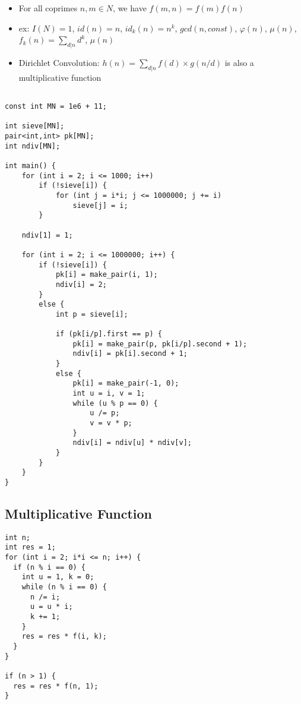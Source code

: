 \documentclass[11pt,a4paper]{article}
\begin{document}
\begin{multicols*}{2}
\begin{itemize}
    \item For all coprimes $n, m \in N$, we have $f(m, n) = f(m)f(n)$
    \item ex: $I(N) = 1$, $id(n) = n$, $id_k(n) = n^k$, $gcd(n, const)$, $\varphi(n)$, $\mu(n)$, $f_k(n) = \sum_{d|n}d^k$, $\mu(n)$
    \item Dirichlet Convolution: $h(n) = \sum_{d|n} f(d) \times g(n/d)$ is also a multiplicative function
\end{itemize}

\begin{lstlisting}

const int MN = 1e6 + 11;

int sieve[MN];         
pair<int,int> pk[MN];  
int ndiv[MN];        

int main() {
    for (int i = 2; i <= 1000; i++)
        if (!sieve[i]) {
            for (int j = i*i; j <= 1000000; j += i)
                sieve[j] = i;
        }

    ndiv[1] = 1;

    for (int i = 2; i <= 1000000; i++) {
        if (!sieve[i]) {
            pk[i] = make_pair(i, 1);
            ndiv[i] = 2;
        }
        else {
            int p = sieve[i];  

            if (pk[i/p].first == p) {  
                pk[i] = make_pair(p, pk[i/p].second + 1);
                ndiv[i] = pk[i].second + 1;  
            }
            else {
                pk[i] = make_pair(-1, 0);
                int u = i, v = 1;
                while (u % p == 0) {
                    u /= p;
                    v = v * p;
                }
                ndiv[i] = ndiv[u] * ndiv[v];
            }
        }
    }
}
\end{lstlisting}
\subsection{Multiplicative Function}
\begin{lstlisting}
int n;
int res = 1;  
for (int i = 2; i*i <= n; i++) {
  if (n % i == 0) {
    int u = 1, k = 0;
    while (n % i == 0) {
      n /= i;
      u = u * i;
      k += 1;
    }
    res = res * f(i, k);
  }
}

if (n > 1) {  
  res = res * f(n, 1);
}
\end{lstlisting}

\end{multicols*}
\end{document}
